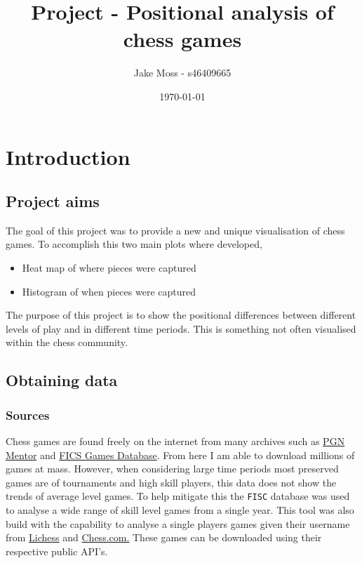\documentclass[11pt]{article}
\author{Jake Moss - s46409665}
\date{\today}
\title{Project - Positional analysis of chess games}
\begin{document}
\maketitle
\tableofcontents

\newpage

\section{Introduction}
\label{sec:org7a3a11c}
\subsection{Project aims}
\label{sec:org1ee37d3}
The goal of this project was to provide a new and unique visualisation of chess games. To accomplish this two main plots where developed,

\begin{itemize}
\item Heat map of where pieces were captured
\item Histogram of when pieces were captured
\end{itemize}

The purpose of this project is to show the positional differences between different levels of play and in different time periods. This is something not often visualised within the chess community.
\subsection{Obtaining data}
\label{sec:org648d4b6}
\subsubsection{Sources}
\label{sec:org8bc0690}
Chess games are found freely on the internet from many archives such as \href{https://www.pgnmentor.com/files.html}{PGN Mentor} and \href{https://www.ficsgames.org/download.html}{FICS Games Database}. From here I am able to download millions of games at mass. However, when considering large time periods most preserved games are of tournaments and high skill players, this data does not show the trends of average level games. To help mitigate this the \texttt{FISC} database was used to analyse a wide range of skill level games from a single year.
This tool was also build with the capability to analyse a single players games given their username from \href{https://lichess.org/}{Lichess} and \href{https://www.chess.com/}{Chess.com.} These games can be downloaded using their respective public API's.
\end{document}
